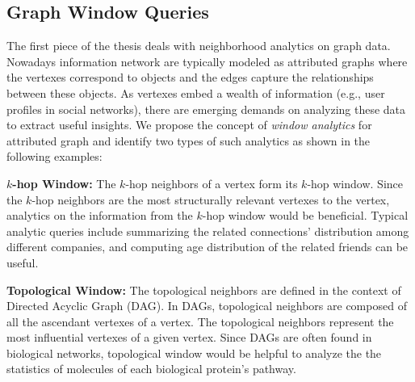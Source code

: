 \subsection{Graph Window Queries}
The first piece of the thesis deals with neighborhood analytics
on graph data. Nowadays information network are typically
modeled as attributed graphs where the 
vertexes correspond to objects and the edges capture the
relationships between these objects. As vertexes embed a wealth
of information (e.g., user profiles in social networks), there are 
emerging demands on analyzing these data to extract useful insights. 
We propose the concept of \emph{window analytics} 
for attributed graph and identify two types of such analytics as shown in the following examples:

\textbf{$k$-hop Window:} The $k$-hop neighbors of a vertex form
its $k$-hop window. Since the $k$-hop neighbors are the most structurally
relevant vertexes to the vertex, analytics on the information from the $k$-hop window
would be beneficial. Typical analytic queries include summarizing the related connections' distribution among different companies, and computing age distribution of the related friends can be useful.

\textbf{Topological Window:} The topological neighbors are defined
in the context of Directed Acyclic Graph (DAG). In DAGs,
topological neighbors are composed of all the ascendant vertexes of a vertex. 
The topological neighbors represent the most influential vertexes of a given vertex.
Since DAGs are often found in biological networks, topological window would
be helpful to analyze the the statistics of molecules of each biological protein's pathway.

